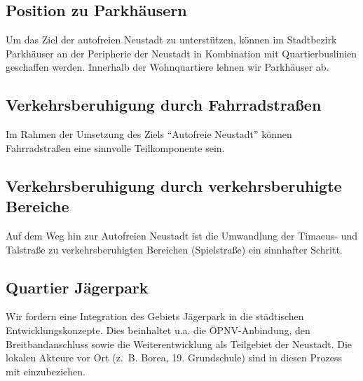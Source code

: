 \documentclass[a4paper, 11pt]{article}
\begin{document}
%


\subsection{Position zu Parkhäusern}

Um das Ziel der autofreien Neustadt zu unterstützen, können im Stadtbezirk Parkhäuser an der Peripherie der Neustadt in Kombination mit Quartierbuslinien geschaffen werden. Innerhalb der Wohnquartiere lehnen wir Parkhäuser ab.



\subsection{Verkehrsberuhigung durch Fahrradstraßen}

Im Rahmen der Umsetzung des Ziels ``Autofreie Neustadt'' können Fahrradstraßen eine sinnvolle Teilkomponente sein.


\subsection{Verkehrsberuhigung durch verkehrsberuhigte Bereiche}

Auf dem Weg hin zur Autofreien Neustadt ist die Umwandlung der Timaeus- und Talstraße zu verkehrsberuhigten Bereichen (Spielstraße) ein sinnhafter Schritt.

\subsection{Quartier Jägerpark}
Wir fordern eine Integration des Gebiets Jägerpark in die städtischen Entwicklungskonzepte. Dies beinhaltet u.a. die ÖPNV-Anbindung, den Breitbandanschluss sowie die Weiterentwicklung als Teilgebiet der Neustadt. Die lokalen Akteure vor Ort (z. B. Borea, 19. Grundschule) sind in diesen Prozess mit einzubeziehen.
\end{document}
